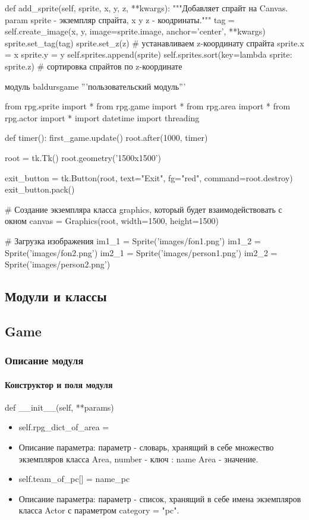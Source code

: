 def add\_sprite(self, sprite, x, y, z, **kwargs):
"""Добавляет спрайт на Canvas.
param sprite - экземпляр спрайта, x y z - коодринаты."""
tag = self.create\_image(x, y, image=sprite.image, anchor='center', **kwargs)
sprite.set\_tag(tag)
sprite.set\_z(z)  \# устанавливаем z-координату спрайта
sprite.x = x
sprite.y = y
self.sprites.append(sprite)
self.sprites.sort(key=lambda sprite: sprite.z) \# сортировка спрайтов по z-координате

модуль baldursgame '''пользовательский модуль'''

from rpg.sprite import *
from rpg.game import *
from rpg.area import *
from rpg.actor import *
import datetime
import threading

def timer():
first\_game.update()
root.after(1000, timer)

root = tk.Tk()
root.geometry('1500x1500')

exit\_button = tk.Button(root, text="Exit", fg="red", command=root.destroy)
exit\_button.pack()

\# Создание экземпляра класса graphics, который будет взаимодействовать с окном
canvas = Graphics(root, width=1500, height=1500)

\# Загрузка изображения
im1\_1 = Sprite('images/fon1.png')
im1\_2 = Sprite('images/fon2.png')
im2\_1 = Sprite('images/person1.png')
im2\_2 = Sprite('images/person2.png')

\subsection{Модули и классы}
\subsection{Game}
\subsubsection{Описание модуля}
\paragraph{Конструктор и поля модуля}
def \_\_init\_\_(self, **params) 
\begin{itemize}
	\item self.rpg\_dict\_of\_area = {} 
	\item Описание параметра: параметр - словарь, хранящий в себе множество экземпляров класса Area, {number - ключ : name Area - значение}.
	\item self.team\_of\_pc[] = name\_pc 
	\item Описание параметра: параметр - список, хранящий в себе имена экземпляров класса Actor с параметром category = "pc".
\end{itemize}
